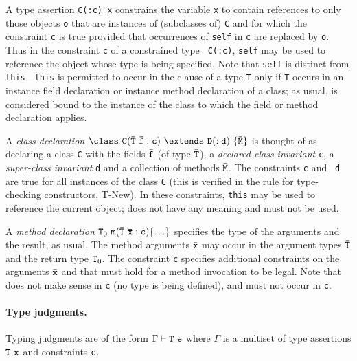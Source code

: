 A type assertion {\tt C(:c) x} constrains the variable {\tt x} to
contain references to only those objects {\tt o} that are instances of
(subclasses of) {\tt C} and for which the constraint {\tt c} is true
provided that occurrences of {\tt self} in {\tt c} are replaced by
{\tt o}. Thus in the constraint {\tt c} of a constrained type {\tt
C(:c)}, {\tt self} may be used to reference the object whose type is
being specified. Note that {\tt self} is distinct from
{\tt this}---{\tt this} is permitted to occur in the clause of
a type {\tt T} only
if {\tt T} occurs in an instance field declaration or instance method
declaration of a class; as usual, \this{} is considered bound to the
instance of the class to which the field or method declaration
applies.

A {\em class declaration} $\tt\class \ C(\bar{T}\ \bar{f}:c)\ \extends\ D(:d)\
\{\bar{M}\}$ is thought of as declaring a class {\tt C} with the
fields $\bar{\tt f}$ (of type $\bar{\tt T}$), a {\em declared class
invariant} {\tt c}, a {\em super-class invariant} {\tt d} and a
collection of methods $\bar{\tt M}$. The constraints {\tt c} and {\tt
d} are true for all instances of the class {\tt C} (this is verified
in the rule for type-checking constructors, T-New).  In these
constraints, {\tt this} may be used to reference the current object;
\self{} does not have any meaning and must not be used.

A {\em method declaration} ${\tt T}_0\ {\tt m(\bar{\tt T}\ \bar{\tt x} :
c)\{\ldots\}}$ specifies the type of the arguments and the result, as
usual.  The method arguments $\bar{\tt x}$ may occur in the argument
types $\bar{\tt T}$ and the return type ${\tt T}_0$.  The constraint
{\tt c} specifies additional constraints on the arguments $\bar{\tt
x}$ and
\this{} that must hold for a method invocation to be legal. Note that
\self{} does not make sense in {\tt c} (no type is being defined), and must not occur in {\tt c}.

\paragraph{Type judgments.}
Typing judgments are of the form $\Gamma \vdash {\tt T}\ {\tt e}$
where $\Gamma$ is a multiset of type assertions ${\tt T}\ {\tt x}$ and
constraints ${\tt c}$. 

